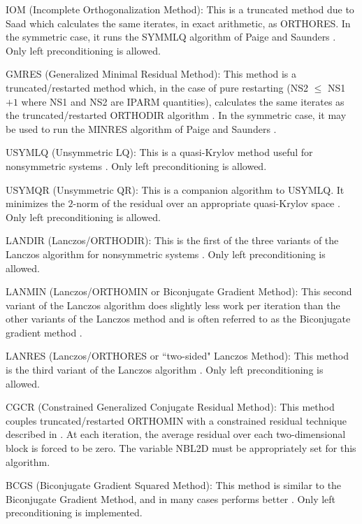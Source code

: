 \begin{list}{}{
               \leftmargin 1.00in \rightmargin 0.25in}
\item[IOM \hfill](Incomplete Orthogonalization Method):
      This is a truncated method due to Saad \cite{IOM1,IOM2}
      which calculates the same iterates, in exact arithmetic, as
      ORTHORES.  In the symmetric case, it runs the SYMMLQ
      algorithm of Paige and Saunders \cite{SYMMLQ}.
      Only left preconditioning is allowed.
 
\item[GMRES \hfill](Generalized Minimal Residual Method):
      This method is a truncated/restarted method which, in the
      case of pure restarting (NS2 $\leq$ NS1 $+1$ where NS1
      and NS2 are IPARM quantities), calculates
      the same iterates as the truncated/restarted ORTHODIR algorithm
      \cite{GMRES}.  In the symmetric case, it may be used to run
      the MINRES algorithm of Paige and Saunders \cite{SYMMLQ}.
 
\item[USYMLQ \hfill](Unsymmetric LQ):
      This is a quasi-Krylov method useful for nonsymmetric
      systems \cite{Yip}.  Only left preconditioning is allowed.
 
\item[USYMQR \hfill](Unsymmetric QR):
      This is a companion algorithm to 
      USYMLQ.  It minimizes the $2$-norm of the residual over
      an appropriate quasi-Krylov space \cite{Yip}.
      Only left preconditioning is allowed.
 
\item[LANDIR \hfill](Lanczos/ORTHODIR):
      This is the first of the three variants of the Lanczos algorithm
      for nonsymmetric systems \cite{LANCZOS}.
      Only left preconditioning is allowed.
 
\item[LANMIN \hfill](Lanczos/ORTHOMIN or Biconjugate Gradient Method):
      This second variant of the Lanczos algorithm does slightly
      less work per iteration than the other variants of the 
      Lanczos method and is often referred to as the Biconjugate
      gradient method \cite{LANCZOS}.
 
\item[LANRES \hfill](Lanczos/ORTHORES or ``two-sided" Lanczos Method):
      This method is the third variant of the Lanczos algorithm
      \cite{LANCZOS}.  Only left preconditioning is allowed.
 
\item[CGCR \hfill](Constrained Generalized Conjugate Residual Method):
      This method couples truncated/restarted ORTHOMIN with
      a constrained residual technique described in 
      \cite{Wallis1,Wallis2}.
      At each iteration, the average residual over each
      two-dimensional block is forced to be zero.  The
      variable NBL2D must be appropriately set for this algorithm.

\item[BCGS \hfill](Biconjugate Gradient Squared Method):
      This method is similar to the Biconjugate Gradient Method,
      and in many cases performs better \cite{BCGS}.  Only left
      preconditioning is implemented.
\end{list}
 

